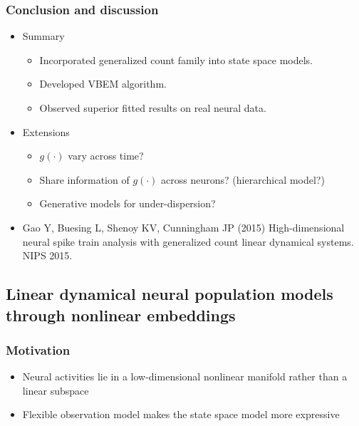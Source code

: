 \documentclass[16pt,presentation]{beamer}
\begin{document}
\begin{frame}
\begin{center}
\begin{tabular}[t]{cc}
\end{tabular}
\end{center}
\end{frame}



\begin{frame}
\frametitle{Conclusion and discussion}
\begin{itemize}
\item Summary
\begin{itemize}
\item Incorporated generalized count family into state space models.
\item Developed VBEM algorithm.
\item Observed superior fitted results on real neural data.
\end{itemize}
\item Extensions
\begin{itemize}
\item $g(\cdot)$ vary across time?
\item Share information of $g(\cdot)$ across neurons? (hierarchical model?)
\item Generative models for under-dispersion?
\end{itemize}
\item \alert{Gao Y}, Buesing L, Shenoy KV, Cunningham JP (2015) High-dimensional neural spike train analysis with generalized count linear dynamical systems. NIPS 2015.
\end{itemize}
\end{frame}



\subsection[]{Linear dynamical neural population models through nonlinear embeddings}

\begin{frame}
\frametitle{Motivation}
\begin{itemize}
\item Neural activities lie in a low-dimensional \alert{nonlinear manifold} rather than a \alert{linear subspace}
\item Flexible observation model makes the state space model more expressive
\end{itemize}
\end{frame}
\end{document}
